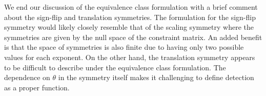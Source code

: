 We end our discussion of the equivalence class formulation with a brief comment about the sign-flip and translation symmetries. The formulation for the sign-flip symmetry would likely closely resemble that of the scaling symmetry where the symmetries are given by the null space of the constraint matrix. An added benefit is that the space of symmetries is also finite due to having only two possible values for each exponent. On the other hand, the translation symmetry appears to be difficult to describe under the equivalence class formulation. The dependence on $\theta$ in the symmetry itself makes it challenging to define detection as a proper function.



